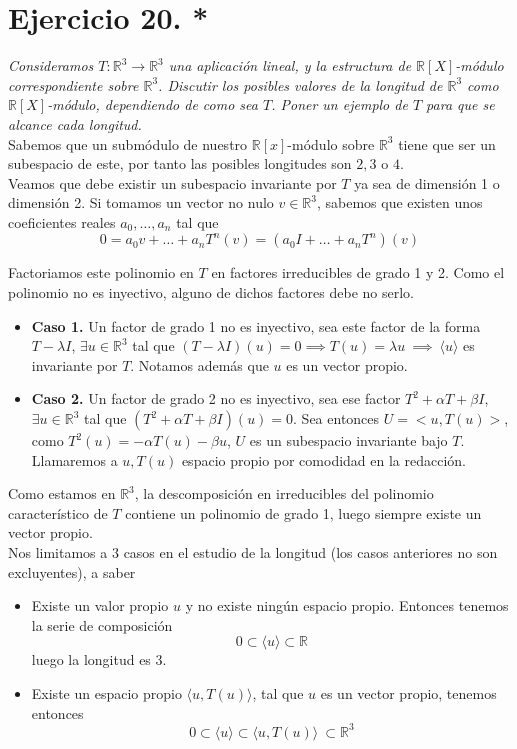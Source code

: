 \section{Ejercicio 20. *} \textit{Consideramos \(T:\mathbb{R}^3 \to
  \mathbb{R}^3\) una aplicación lineal, y la estructura de
  \(\mathbb{R}[X]\)-módulo correspondiente sobre \(\mathbb{R}^3\). Discutir los
  posibles valores de la longitud de \(\mathbb{R}^3\) como
  \(\mathbb{R}[X]\)-módulo, dependiendo de como sea \(T\). Poner un ejemplo de
  \(T\) para que se alcance cada longitud.}\\

Sabemos que un submódulo de nuestro \(\mathbb{R}[x]\)-módulo sobre
\(\mathbb{R}^3\) tiene  que ser un subespacio de este, por tanto las posibles
longitudes son \(2,3\) o \(4\).\\

Veamos que debe existir un subespacio invariante por \(T\) ya sea de dimensión 1
o dimensión 2.
Si tomamos un vector no nulo \(v \in \mathbb{R}^3\), sabemos que existen unos
coeficientes reales \(a_0, \dots, a_n\) tal que
\[
  0 = a_0v + \dots + a_nT^n(v) = (a_0I + \dots + a_nT^n)(v)
\]

Factoriamos este polinomio en \(T\) en factores irreducibles de grado 1 y 2.
Como el polinomio no es inyectivo, alguno de dichos factores debe no serlo.
\begin{itemize}
\item \textbf{Caso 1.} Un factor de grado 1 no es inyectivo, sea este factor de la
  forma \(T - \lambda I\), \(\exists u \in \mathbb{R}^3\) tal que \((T - \lambda
  I)(u) = 0 \implies T(u) = \lambda u \ \implies \ \langle u \rangle\) es
  invariante por \(T\). Notamos además que \(u\) es un vector propio.
\item \textbf{Caso 2.} Un factor de grado 2 no es inyectivo, sea ese factor
  \(T^2 + \alpha T + \beta I\), \(\exists u \in \mathbb{R}^3\) tal que \((T^2 +
  \alpha T + \beta I)(u)= 0\). Sea entonces \(U = <u,T(u)>\), como \(T^2(u) =
  -\alpha T(u) - \beta u \), \(U\) es un subespacio invariante bajo \(T\).
  Llamaremos a \(u, T(u)\) espacio propio por comodidad en la redacción.
\end{itemize}

Como estamos en \(\mathbb{R}^3\), la descomposición en irreducibles del
polinomio característico de \(T\) contiene un polinomio de grado 1, luego
siempre existe un vector propio.\\

Nos limitamos  a 3 casos en el estudio de la longitud (los casos
anteriores no son excluyentes), a saber
\begin{itemize}
\item Existe un valor propio \(u\) y no existe ningún espacio propio. Entonces
  tenemos la serie de composición
  \[
    0 \subset \langle u \rangle \subset \mathbb{R}
  \]
  luego la longitud es 3.
\item Existe un espacio propio \(\langle u, T(u) \rangle\), tal que \(u\) es
  un vector propio, tenemos entonces
  \[
    0 \subset \langle u \rangle \subset \langle u, T(u) \rangle\ \subset \mathbb{R}^3
  \]
\end{itemize}

